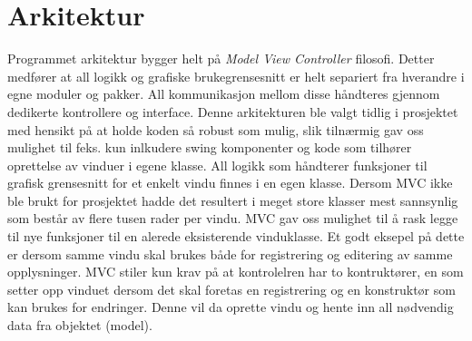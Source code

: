 \section{Arkitektur}
Programmet arkitektur bygger helt på \textit{Model View Controller} filosofi. Detter medfører at all logikk og grafiske brukegrensesnitt er helt separiert fra hverandre i egne moduler og pakker. All kommunikasjon mellom disse håndteres gjennom dedikerte kontrollere og interface. Denne arkitekturen ble valgt tidlig i prosjektet med hensikt på at holde koden så robust som mulig, slik tilnærmig gav oss mulighet til feks. kun inlkudere swing komponenter og kode som tilhører oprettelse av vinduer i egene klasse. All logikk som håndterer funksjoner til grafisk grensesnitt for et enkelt vindu finnes i en egen klasse. Dersom MVC ikke ble brukt for prosjektet hadde det resultert i meget store klasser mest sannsynlig som består av flere tusen rader per vindu. MVC gav oss mulighet til å rask legge til nye funksjoner til en alerede eksisterende vinduklasse. Et godt eksepel på dette er dersom samme vindu skal brukes både for registrering og editering av samme opplysninger. MVC stiler kun krav på at kontrolelren har to kontruktører, en som setter opp vinduet dersom det skal foretas en registrering og en konstruktør som kan brukes for endringer. Denne vil da oprette vindu og hente inn all nødvendig data fra objektet (model). 